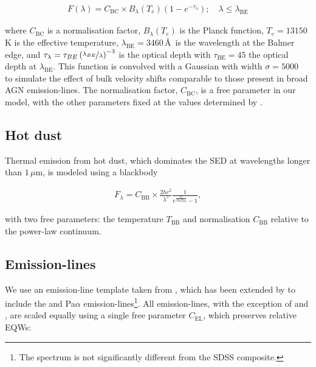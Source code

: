 \begingroup\makeatletter{}\check@mathfonts
\begin{eqnarray}
  F(\lambda) = C_{\text{BC}} \times B_\lambda(T_e)(1-e^{-\tau_\lambda}); \quad \lambda \leq \lambda_{\text{BE}}
\end{eqnarray}
\endgroup

\noindent where $C_{\text{BC}}$ is a normalisation factor, $B_\lambda(T_e)$ is the Planck function, $T_e=13150$\,K is the effective temperature, $\lambda_{\text{BE}}=3460$\,\AA\, is the wavelength at the Balmer edge, and $\tau_\lambda = \tau_{BE}\left( \nicefrac{\lambda_{BE}} {\lambda} \right)^{-3}$ is the optical depth with $\tau_{\text{BE}}=45$ the optical depth at $\lambda_{\text{BE}}$.
This function is convolved with a Gaussian with width $\sigma=5000$\,\kms\, to simulate the effect of bulk velocity shifts comparable to those present in broad AGN emission-lines.
The normalisation factor, $C_{\text{BC}}$, is a free parameter in our model, with the other parameters fixed at the values determined by \citet{grandi82}. 

\subsection{Hot dust}

Thermal emission from hot dust, which dominates the SED at wavelengths longer than $1$\,$\mu$m, is modeled using a blackbody

\begingroup\makeatletter{}\check@mathfonts
\begin{eqnarray}
  F_\lambda = C_{\text{BB}} \times \frac{2 hc^2}{\lambda^5}\frac{1}{ e^{\frac{hc}{\lambda k_\text{B}T_{\text{BB}}}} - 1},
\end{eqnarray}
\endgroup

\noindent with two free parameters: the temperature $T_{\text{BB}}$ and normalisation $C_{\text{BB}}$ relative to the power-law continuum.

\subsection{Emission-lines}

We use an emission-line template taken from \citet{francis91}, which has been extended by \citet{maddox06} to include the \ha and Pa$\alpha$ emission-lines\footnote{The spectrum is not significantly different from the \citet{vandenberk01} SDSS composite.}.
All emission-lines, with the exception of \ha and \hbns, are scaled equally using a single free parameter $C_{\text{EL}}$, which preserves relative EQWs:

